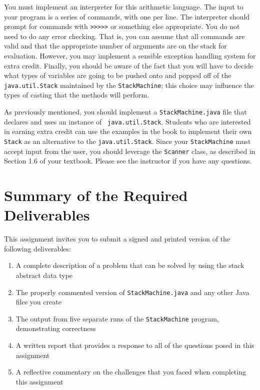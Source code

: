 You must implement an interpreter for this arithmetic language. The input to your program is a series of commands, with
one per line. The interpreter should prompt for commands with
\texttt{\textgreater{}\textgreater{}\textgreater{}\textgreater{}\textgreater{}} or something else appropriate. You do
not need to do any error checking.  That is, you can assume that all commands are valid and that the appropriate number
of arguments are on the stack for evaluation. However, you may implement a sensible exception handling system for
extra credit.  Finally, you should be aware of the fact that you will have to decide what types of variables are going
to be pushed onto and popped off of the {\tt java.util.Stack} maintained by the \texttt{StackMachine}; this choice may
influence the types of casting that the methods will perform.

As previously mentioned, you should implement a {\tt StackMachine.java} file that declares and uses an instance of {\tt
java.util.Stack}. Students who are interested in earning extra credit can use the examples in the book to implement
their own {\tt Stack} as an alternative to the {\tt java.util.Stack}.  Since your {\tt StackMachine} must accept input
from the user, you should leverage the {\tt Scanner} class, as described in Section 1.6 of your textbook. Please see the
instructor if you have any questions.

\section*{Summary of the Required Deliverables}

  This assignment invites you to submit a signed and printed version of the following deliverables:

  \begin{enumerate}
  \itemsep0pt

  \item A complete description of a problem that can be solved by using the stack abstract data type

  \item The properly commented version of {\tt StackMachine.java} and any other Java files you create

  \item The output from five separate runs of the {\tt StackMachine} program, demonstrating correctness

  \item A written report that provides a response to all of the questions posed in this assignment

  \item A reflective commentary on the challenges that you faced when completing this assignment

  \end{enumerate}


